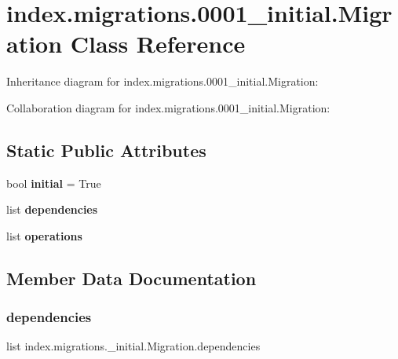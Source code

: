 \hypertarget{classindex_1_1migrations_1_10001__initial_1_1Migration}{}\section{index.\+migrations.0001\+\_\+initial.Migration Class Reference}
\label{classindex_1_1migrations_1_10001__initial_1_1Migration}


Inheritance diagram for index.\+migrations.0001\+\_\+initial.Migration\+:


Collaboration diagram for index.\+migrations.0001\+\_\+initial.Migration\+:
\subsection*{Static Public Attributes}
\begin{DoxyCompactItemize}
\item 
\mbox{\label{classindex_1_1migrations_1_10001__initial_1_1Migration_ab51d301c0976eab66687b62139ea6da5}} 
bool {\bfseries initial} = True
\item 
list {\bfseries dependencies}
\item 
list {\bfseries operations}
\end{DoxyCompactItemize}


\subsection{Member Data Documentation}
\mbox{\label{classindex_1_1migrations_1_10001__initial_1_1Migration_a9ce6aa5d70670d8174bbb924a196d484}} 
\subsubsection{\texorpdfstring{dependencies}{dependencies}}
{\footnotesize\ttfamily list index.\+migrations.\+\_\+initial.\+Migration.\+dependencies\hspace{0.3cm}{\ttfamily [static]}}

